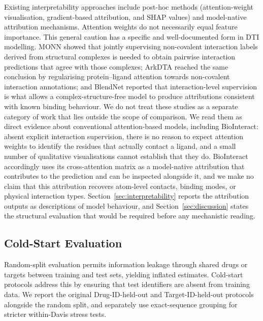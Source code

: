 \documentclass[fleqn,10pt]{wlscirep}
\begin{document}
Existing interpretability approaches include post-hoc methods (attention-weight
visualisation, gradient-based attribution, and SHAP values\cite{jimenez2020drug})
and model-native attribution mechanisms.  Attention weights do not necessarily
equal feature importance.\cite{jain2019attention}
This general caution has a specific and well-documented form in DTI modelling.
MONN showed that jointly supervising non-covalent interaction labels derived
from structural complexes is needed to obtain pairwise interaction predictions
that agree with those complexes;\cite{li2020monn} ArkDTA reached the same
conclusion by regularising protein--ligand attention towards non-covalent
interaction annotations;\cite{gim2023arkdta} and BlendNet reported that
interaction-level supervision is what allows a complex-structure-free model to
produce attributions consistent with known binding
behaviour.\cite{seo2024blendnet}  We do not treat these studies as a separate
category of work that lies outside the scope of comparison.  We read them as
direct evidence about conventional attention-based models, including
BioInteract: absent explicit interaction supervision, there is no reason to
expect attention weights to identify the residues that actually contact a
ligand, and a small number of qualitative visualisations cannot establish that
they do.  BioInteract accordingly uses its cross-attention matrix as a
model-native attribution that contributes to the prediction and can be inspected
alongside it, and we make no claim that this attribution recovers atom-level
contacts, binding modes, or physical interaction types.  Section~\ref{sec:interpretability}
reports the attribution outputs as descriptions of model behaviour, and
Section~\ref{sec:discussion} states the structural evaluation that would be
required before any mechanistic reading.

\subsection{Cold-Start Evaluation}

Random-split evaluation permits information leakage through shared drugs or
targets between training and test sets, yielding inflated
estimates.\cite{huang2021therapeutics}  Cold-start protocols address this by
ensuring that test identifiers are absent from training data. We report the
original Drug-ID-held-out and Target-ID-held-out protocols alongside the random
split, and separately use exact-sequence grouping for stricter within-Davis
stress tests.
\end{document}
